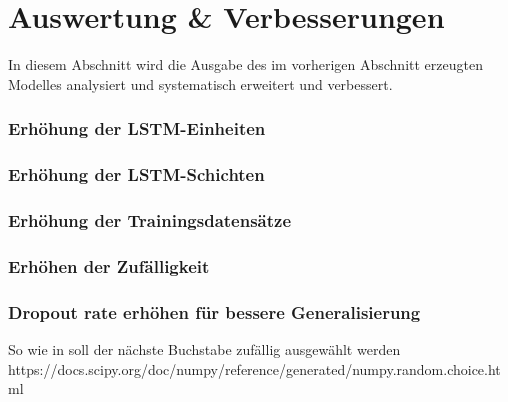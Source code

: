 \chapter{Auswertung \& Verbesserungen}
\label{ch:analysis}

In diesem Abschnitt wird die Ausgabe des im vorherigen Abschnitt erzeugten Modelles analysiert und
systematisch erweitert und verbessert.


\subsection{Erhöhung der LSTM-Einheiten}
\label{subsec:increase-lstm}

\subsection{Erhöhung der LSTM-Schichten}
\label{subsec:increase-lstm-layers}

\subsection{Erhöhung der Trainingsdatensätze}
\label{subsec:increase-num-dataset}

\subsection{Erhöhen der Zufälligkeit}
\label{subsec:increase-randomness}

\subsection{Dropout rate erhöhen für bessere Generalisierung}
\label{subsec:enhance-dropout-rate}

So wie in \autocite{dabbura} soll der nächste Buchstabe zufällig ausgewählt werden
https://docs.scipy.org/doc/numpy/reference/generated/numpy.random.choice.html
